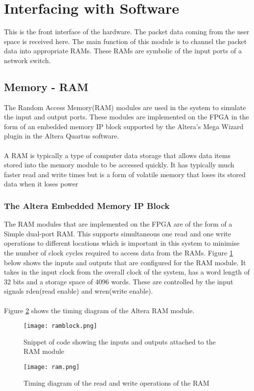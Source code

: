 \documentclass[twoside,12pt,fleqn]{book} %
\begin{document}
\section{Interfacing with Software}
This is the front interface of the hardware. The packet data coming from the user space is received here. The main function of this module is to channel the packet data into appropriate RAMs. These RAMs are symbolic of the input ports of a network switch.

\subsection{Memory - RAM}
The Random Access Memory(RAM) modules are used in the system to simulate the input and output ports. These modules are implemented on the FPGA in the form of an embedded memory IP block supported by the Altera's Mega Wizard plugin in the Altera Quartus software.\\\\
A RAM is typically a type of computer data storage that allows data items stored into the memory module to be accessed quickly. It has typically much faster read and write times but is a form of volatile memory that loses its stored data when it loses power
\subsubsection{The Altera Embedded Memory IP Block}
The RAM modules that are implemented on the FPGA are of the form of a Simple dual-port RAM. This supports simultaneous one read and one write operations to different locations which is important in this system to minimise the number of clock cycles required to access data from the RAMs. Figure \ref{fig:RAM_input} below shows the inputs and outputs that are configured for the RAM module. It takes in the input clock from the overall clock of the system, has a word length of 32 bits and a storage space of 4096 words. These are controlled by the input signals rden(read enable) and wren(write enable).\\\\
Figure \ref{fig:ram} shows the timing diagram of the Altera RAM module.
\begin{figure}[ht]
        \centering
        \texttt{[image: ramblock.png]}
        \caption{Snippet of code showing the inputs and outputs attached to the RAM module}
        \label{fig:RAM_input}
    \end{figure}
    \begin{figure}[ht]
        \centering
        \texttt{[image: ram.png]}
        \caption{Timing diagram of the read and write operations of the RAM}
        \label{fig:ram}
    \end{figure}
\end{document}
